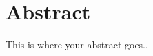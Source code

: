%
%
%



%


\renewcommand{\baselinestretch}{1.50}\normalsize


\chapter*{Abstract}
This is where your abstract goes..
\newpage

\tableofcontents
\listoffigures
\listoftables
\printnomenclature
\newpage
\listofsymbols

\newpage



%

%
%




